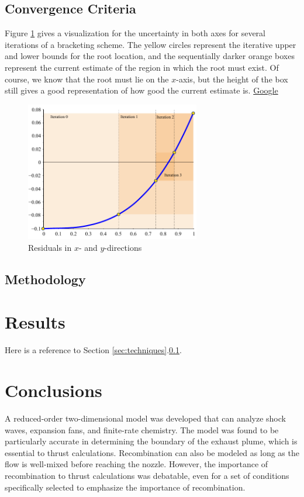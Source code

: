 \documentclass{aiaa-pretty}
\begin{document}
\subsection{Convergence Criteria} \label{ssec:criteria}
Figure \ref{fig:f:tol} gives a visualization for the uncertainty in both axes for several iterations of a bracketing scheme.  The yellow circles represent the iterative upper and lower bounds for the root location, and the sequentially darker orange boxes represent the current estimate of the region in which the root must exist.  Of course, we know that the root must lie on the $x$-axis, but the height of the box still gives a good representation of how good the current estimate is.  \href{http://www.google.com}{Google}

\begin{figure}
 \centering
 \includegraphics[width=3in]{./pics/f1_tol.pdf}
 \caption{ \label{fig:f:tol}
  Residuals in $x$- and $y$-directions}
\end{figure}


\subsection{Methodology}



\section{Results}
Here is a reference to Section \ref{sec:techniques}.\ref{ssec:criteria}.


\section{Conclusions}                            \label{sec:conclusion}
A reduced-order two-dimensional model was developed that can analyze shock waves, expansion fans, and finite-rate chemistry.  The model was found to be particularly accurate in determining the boundary of the exhaust plume, which is essential to thrust calculations.  Recombination can also be modeled as long as the flow is well-mixed before reaching the nozzle.  However, the importance of recombination to thrust calculations was debatable, even for a set of conditions specifically selected to emphasize the importance of recombination.
\end{document}
